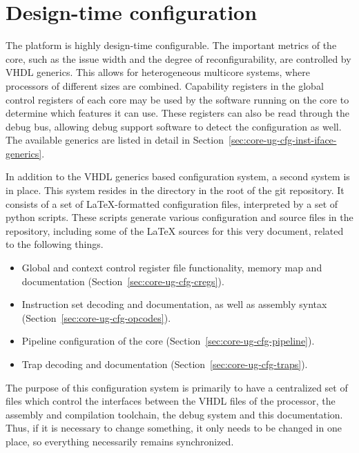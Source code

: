 
\clearpage
\section{Design-time configuration}
\label{sec:core-ug-cfg}


The \rvex{} platform is highly design-time configurable. The important metrics
of the core, such as the issue width and the degree of reconfigurability, are
controlled by VHDL generics. This allows for heterogeneous multicore systems,
where \rvex{} processors of different sizes are combined. Capability registers
in the global control registers of each \rvex{} core may be used by the software
running on the core to determine which features it can use. These registers can
also be read through the debug bus, allowing debug support software to detect
the configuration as well. The available generics are listed in detail in
Section~\ref{sec:core-ug-cfg-inst-iface-generics}.

In addition to the VHDL generics based configuration system, a second system is
in place. This system resides in the  directory in the root of the
\rvex{} git repository. It consists of a set of LaTeX-formatted configuration
files, interpreted by a set of python scripts. These scripts generate various
configuration and source files in the repository, including some of the LaTeX
sources for this very document, related to the following things.

\begin{itemize}

\item Global and context control register file functionality, memory map and
      documentation (Section~\ref{sec:core-ug-cfg-cregs}).

\item Instruction set decoding and documentation, as well as assembly syntax
      (Section~\ref{sec:core-ug-cfg-opcodes}).

\item Pipeline configuration of the \rvex{} core
      (Section~\ref{sec:core-ug-cfg-pipeline}).

\item Trap decoding and documentation (Section~\ref{sec:core-ug-cfg-traps}).

\end{itemize}

\noindent The purpose of this configuration system is primarily to have a 
centralized set of files which control the interfaces between the VHDL files of 
the processor, the assembly and compilation toolchain, the debug system and this 
documentation. Thus, if it is necessary to change something, it only needs to be 
changed in one place, so everything necessarily remains synchronized.

